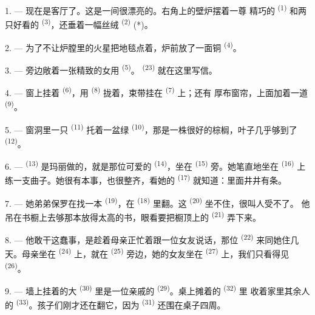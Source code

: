 1. --- 现在是客厅了。这是一间很漂亮的。右角上的壁炉摆着一尊
精巧的 \textsuperscript{(1)} 和两只好看的
\textsuperscript{(3)}，还垂着一幅丝绒 \textsuperscript{(2)} (*)。

2. --- 为了不让炉膛里的火星把地毯点着，炉前放了一面铜
\textsuperscript{(4)}。

3. --- 旁边敞着一张精致的女用 \textsuperscript{(5)}。
 \textsuperscript{(23)} 就在这里写信。

4. --- 窗上挂着 \textsuperscript{(6)}，用
\textsuperscript{(8)} 拢着，束带挂在 \textsuperscript{(7)} 上；还有
厚布窗帘，上面加着一道 \textsuperscript{(9)}。

5. --- 窗洞里一只 \textsuperscript{(11)} 托着一盆绿
\textsuperscript{(10)}，那是一株很好的棕榈，叶子几乎够到了
\textsuperscript{(12)}。

6. ---  \textsuperscript{(13)} 是玛丽做的，就是那位可爱的
 \textsuperscript{(14)}，坐在 \textsuperscript{(15)} 旁。她笔直地坐在
 \textsuperscript{(16)} 上练一支曲子。她很有本事，也很整齐，看她的
 \textsuperscript{(17)} 就知道：里面井井有条。

\VUsaut{5.0mm}
\VUsaut{3.0mm}

7. --- 她弟弟保罗在找一本 \textsuperscript{(19)}，在
\textsuperscript{(18)} 里翻。这 \textsuperscript{(20)} 坐不住，很叫人受不了。
他吊在书橱上去够那本放得太高的书，眼看要把橱顶上的
\textsuperscript{(21)} 弄下来。

8. --- 他敢干这蠢事，是趁着母亲正忙着跟一位女友说话，那位
\textsuperscript{(22)} 来同她住几天。母亲坐在 \textsuperscript{(24)} 上，就在
 \textsuperscript{(25)} 旁边，她的女友坐在
\textsuperscript{(27)} 上，我们只看得见 \textsuperscript{(26)}。

9. --- 墙上挂着的大 \textsuperscript{(30)} 里是一位亲戚的
 \textsuperscript{(29)}。桌上摊着的 \textsuperscript{(32)} 里
收着家里其余人的 \textsuperscript{(33)}。孩子们刚才还在翻它，因为
 \textsuperscript{(31)} 还围在桌子四周。

